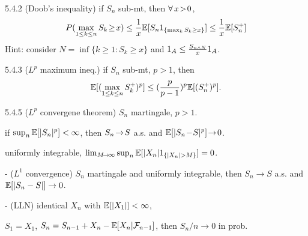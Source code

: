 \begin{thm}{5.4.2} (Doob's inequality)
    if $S_n$ sub-mt, then $\forall\, x \!>\! 0$, 
    \vspace{-1ex}\[  
        P ( \max_{1 \leq k\leq n} S_k \!\geq\! x ) 
        \leq \frac{1}{x} \mathbb{E}[S_n 1_{\{\max_k S_k \geq x\}}] 
        \leq \frac{1}{x} \mathbb{E}[S_n^+]
    \]
    Hint: consider $N = \inf\{k \geq 1\!: S_k \geq x\}$ and $1_{A} \leq \frac{S_{n \wedge N}}{x} 1_{A}$.
\end{thm}

\begin{thm}{5.4.3} ($L^p$ maximum ineq.) if $S_n$ sub-mt, $p > 1$, then 
    \[ \mathbb{E}[ (\max_{1 \leq k \leq n} S_k^+)^p ] \leq (\frac{p}{p-1})^p \mathbb{E}[(S_n^+)^p].\]
\end{thm}

\begin{thm}{5.4.5} ($L^p$ convergene theorem) $S_n$ martingale, $p > 1$.

    if $\sup_n \mathbb{E}[\lvert S_n \rvert^p] < \infty$, then $S_n \!\rightarrow\! S$ a.s. and $\mathbb{E}[\lvert S_n \!-\! S \rvert^p] \!\rightarrow\! 0$.
\end{thm}

\begin{defi}
    uniformly integrable, $\lim_{M\!\rightarrow\! \infty} \sup_n \mathbb{E}[\lvert X_n \rvert 1_{\{\lvert X_n \rvert > M\}}] = 0$.
\end{defi}

\begin{thm}{-} ($L^1$ convergence) $S_n$ martingale and uniformly integrable, then
    $S_n \rightarrow S$ a.s. and $\mathbb{E}[\lvert S_n - S \rvert] \rightarrow 0$.
\end{thm}

\begin{thm}{-} (LLN) identical $X_n$ with $\mathbb{E}[\lvert X_1 \rvert] < \infty$, 

    $S_1 = X_1$, $S_n = S_{n-1} + X_n - \mathbb{E}[X_n \vert \mathcal{F}_{n-1}]$, then $S_n/n \rightarrow 0$ in prob.
\end{thm}






















































